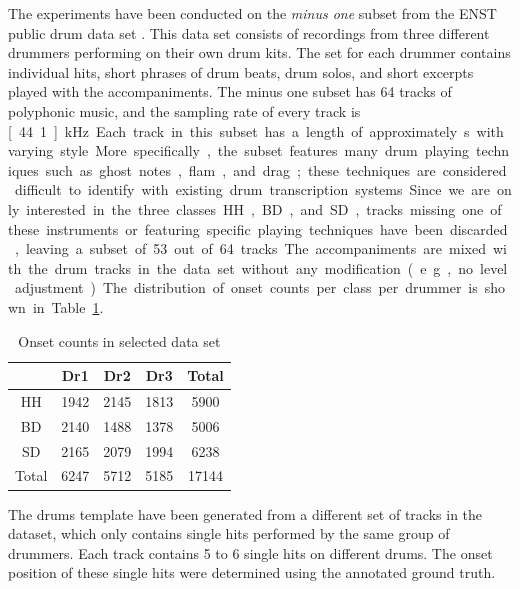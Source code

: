 \documentclass{article}
\newcommand{\tabref}[1]{\mbox{Table~\ref{#1}}}
\begin{document}
The experiments have been conducted on the \textit{minus one} subset from the ENST public drum data set \cite{gillet_enst-drums:_2006}. This data set consists of recordings from three different drummers performing on their own drum kits. The set for each drummer contains individual hits, short phrases of drum beats, drum solos, and short excerpts played with the accompaniments. The minus one subset has 64 tracks of polyphonic music, and the sampling rate of every track is \unit[44.1]{kHz} Each track in this subset has a length of approximately \unit[70]{s} with varying style. More specifically, the subset features many drum playing techniques such as ghost notes, flam, and drag; these techniques are considered difficult to identify with existing drum transcription systems. Since we are only interested in the three classes HH, BD, and SD, tracks missing one of these instruments or featuring specific playing techniques have been discarded, leaving a subset of 53 out of 64 tracks.

The accompaniments are mixed with the drum tracks in the data set without any modification (e.g., no level adjustment). The distribution of onset counts per class per drummer is shown in \tabref{tab:onsetCount}. %

\begin{table}[ht]
\begin{footnotesize}
\centering
\begin{tabular}{|c|c|c|c|c|}
\hline
 & Dr1    & Dr2    & Dr3    & Total \\ \hline
HH        & 1942 & 2145 & 1813 & 5900  \\ \hline
BD        & 2140 & 1488 & 1378 & 5006  \\ \hline
SD        & 2165 & 2079 & 1994 & 6238  \\ \hline
Total     & 6247 & 5712 & 5185 & 17144 \\ \hline
\end{tabular}
 \caption{Onset counts in selected data set}%
 \label{tab:onsetCount}
\end{footnotesize}
\end{table}

The drums template have been generated from a different set of tracks in the dataset, which only contains single hits performed by the same group of drummers. Each track contains 5 to 6 single hits on different drums. The onset position of these single hits were determined using the annotated ground truth. 
\end{document}
